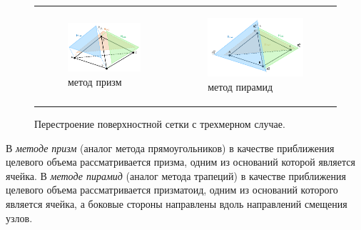 \documentclass[a4paper,14pt]{extarticle}                     %
\theoremstyle{plain}                                         %
\begin{document}
\begin{figure}[h]
\centering
\begin{tabular}{ll}
\begin{subfigure}{0.4\textwidth}\centering\includegraphics[width=1.0\columnwidth]{fig/3dr_prisms.pdf}\caption{метод призм}\end{subfigure} &
\begin{subfigure}{0.45\textwidth}\centering\includegraphics[width=1.0\columnwidth]{fig/3dr_pyramids.pdf}\caption{метод пирамид}\end{subfigure}
\end{tabular}
\singlespacing
\caption{Перестроение поверхностной сетки с трехмерном случае.}
\label{fig:text_1_remesh3}
\end{figure}

В \textit{методе призм} (аналог метода прямоугольников) в качестве приближения целевого объема рассматривается призма, одним из оснований которой является ячейка.
В \textit{методе пирамид} (аналог метода трапеций) в качестве приближения целевого объема рассматривается призматоид, одним из оснований которого является ячейка, а боковые стороны направлены вдоль направлений смещения узлов.
\end{document}
